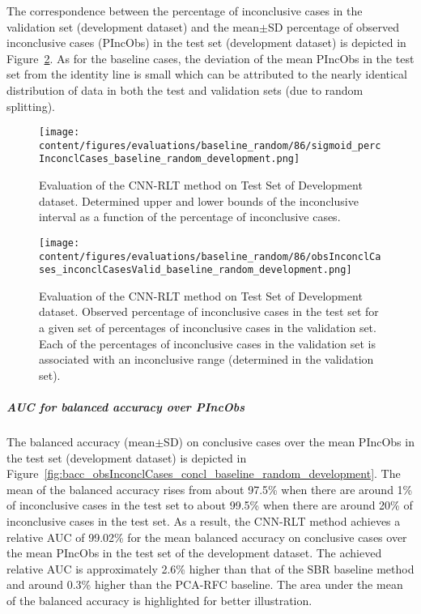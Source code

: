 The correspondence between the percentage of inconclusive cases in the validation set (development dataset) and 
the mean$\pm$SD percentage of observed inconclusive cases (PIncObs) in the test set (development dataset) 
is depicted in Figure~\ref{fig:obsInconclCases_inconclCasesValid_baseline_random_development}.
As for the baseline cases, the deviation of the mean PIncObs in the test set from the 
identity line is small which can be attributed to the nearly identical distribution of data in both the test and validation sets 
(due to random splitting).


\begin{figure}[ht]
  \centering
  \texttt{[image: content/figures/evaluations/baseline\_random/86/sigmoid\_percInconclCases\_baseline\_random\_development.png]}
  \caption{Evaluation of the CNN-RLT method on Test Set of Development dataset. 
  Determined upper and lower bounds of the inconclusive interval as a function of the percentage of inconclusive cases.} 
  \label{fig:baseline_random_percInconclCases_development}
\end{figure}


\begin{figure}[ht]
  \centering
  \texttt{[image: content/figures/evaluations/baseline\_random/86/obsInconclCases\_inconclCasesValid\_baseline\_random\_development.png]}
  \caption{Evaluation of the CNN-RLT method on Test Set of Development dataset.
  Observed percentage of inconclusive cases in the test set 
  for a given set of percentages of inconclusive cases in the validation set.
  Each of the percentages of inconclusive cases in the validation set is associated 
  with an inconclusive range (determined in the validation set).} 
  \label{fig:obsInconclCases_inconclCasesValid_baseline_random_development}
\end{figure} 


\subparagraph{AUC for balanced accuracy over PIncObs}

The balanced accuracy (mean$\pm$SD) on conclusive cases over the mean PIncObs in the test set (development dataset) 
is depicted in Figure~\ref{fig:bacc_obsInconclCases_concl_baseline_random_development}.
The mean of the balanced accuracy rises from about 97.5\% 
when there are around 1\% of inconclusive cases in the test set to about 99.5\% 
when there are around 20\% of inconclusive cases in the test set.
As a result, the CNN-RLT method achieves a relative AUC of 99.02\% for the mean balanced accuracy on conclusive cases
over the mean PIncObs in the test set of the development dataset.
The achieved relative AUC is approximately 2.6\% higher than that of the SBR baseline method 
and around 0.3\% higher than the PCA-RFC baseline.
The area under the mean of the balanced accuracy is highlighted for better illustration.


